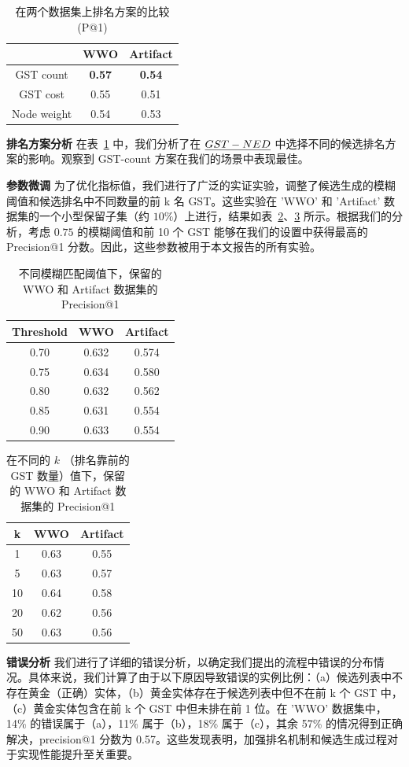 \documentclass[11pt]{article}
\begin{document}
\begin{table}[htbp]
    \centering
    \begin{tabular}{c|c|c}
     & WWO	& Artifact \\
    \hline
    GST count	& \textbf{0.57} & \textbf{0.54} \\
    GST cost	& 0.55 & 0.51 \\
    Node weight	& 0.54 & 0.53 \\
    \end{tabular}
    \caption{在两个数据集上排名方案的比较 (P@1)}
    \label{tab:abl_tab}
\end{table}

\noindent
\textbf{排名方案分析}
在表~\ref{tab:abl_tab} 中，我们分析了在 $\emph{GST-NED}$ 中选择不同的候选排名方案的影响。观察到 GST-count 方案在我们的场景中表现最佳。

\noindent
\textbf{参数微调}
为了优化指标值，我们进行了广泛的实证实验，调整了候选生成的模糊阈值和候选排名中不同数量的前 k 名 GST。这些实验在 'WWO' 和 'Artifact' 数据集的一个小型保留子集（约 $10\%$）上进行，结果如表~\ref{tbl:hyper_threshold}、\ref{tbl:hyper_k} 所示。根据我们的分析，考虑 $0.75$ 的模糊阈值和前 10 个 GST 能够在我们的设置中获得最高的 Precision@1 分数。因此，这些参数被用于本文报告的所有实验。

\begin{table}[htbp]
\centering
\begin{tabular}{c|cc}
Threshold & WWO & Artifact \\ \hline
0.70 & 0.632 & 0.574 \\
0.75 & 0.634 & 0.580 \\
0.80 & 0.632 & 0.562 \\
0.85 & 0.631 & 0.554 \\
0.90 & 0.633 & 0.554 \\
\end{tabular}
\caption{\label{tbl:hyper_threshold}不同模糊匹配阈值下，保留的 WWO 和 Artifact 数据集的 Precision@1}
\end{table}

\begin{table}[htbp]
\centering
\begin{tabular}{c|cc}
k & WWO & Artifact \\ \hline
1  & 0.63 & 0.55 \\
5  & 0.63 & 0.57 \\
10 & 0.64 & 0.58 \\
20 & 0.62 & 0.56 \\
50 & 0.63 & 0.56 \\
\end{tabular}
\caption{\label{tbl:hyper_k}在不同的 $k$ （排名靠前的 GST 数量）值下，保留的 WWO 和 Artifact 数据集的 Precision@1}
\end{table}
\noindent
\textbf{错误分析}
我们进行了详细的错误分析，以确定我们提出的流程中错误的分布情况。具体来说，我们计算了由于以下原因导致错误的实例比例：（a）候选列表中不存在黄金（正确）实体，（b）黄金实体存在于候选列表中但不在前 k 个 GST 中，（c）黄金实体包含在前 k 个 GST 中但未排在前 1 位。在 'WWO' 数据集中，14\% 的错误属于（a），11\% 属于（b），18\% 属于（c），其余 57\% 的情况得到正确解决，precision@1 分数为 0.57。这些发现表明，加强排名机制和候选生成过程对于实现性能提升至关重要。
\end{document}
